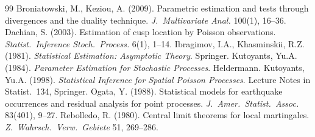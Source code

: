 \documentclass[smallextended,natbib]{svjour3}
\begin{document}
\begin{thebibliography}{99}
 Broniatowski, M., Keziou, A. (2009). Parametric estimation and tests through divergences and the duality technique. \textit{J.\ Multivariate Anal.} 100(1), 16--36.
 Dachian, S. (2003). Estimation of cusp location by Poisson observations. \textit{Statist.\ Inference Stoch.\ Process.} 6(1), 1--14.
 Ibragimov, I.A., Khasminskii, R.Z. (1981). \textit{Statistical Estimation: Asymptotic Theory}. Springer.
 Kutoyants, Yu.A. (1984). \textit{Parameter Estimation for Stochastic Processes}. Heldermann.
 Kutoyants, Yu.A. (1998). \textit{Statistical Inference for Spatial Poisson Processes}. Lecture Notes in Statist.\ 134, Springer.
 Ogata, Y. (1988). Statistical models for earthquake occurrences and residual analysis for point processes. \textit{J.\ Amer.\ Statist.\ Assoc.} 83(401), 9--27.
 Rebolledo, R. (1980). Central limit theorems for local martingales. \textit{Z.\ Wahrsch.\ Verw.\ Gebiete} 51, 269--286.
\end{thebibliography}
\end{document}
